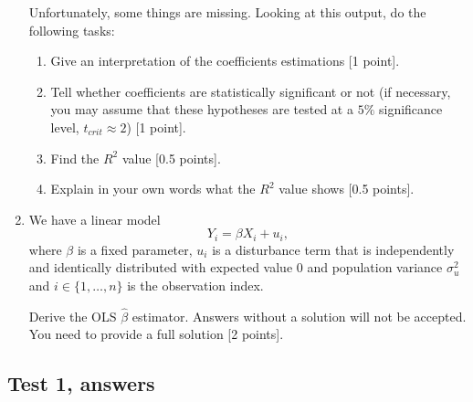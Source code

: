 \begin{enumerate}
Unfortunately, some things are missing. Looking at this output, do the following tasks:

\begin{enumerate}
    \item 
    Give an interpretation of the coefficients estimations [1 point].
    
    \item
    Tell whether coefficients are statistically significant or not (if necessary, you may assume that these hypotheses are tested at a $5\%$ significance level, $t_{crit} \approx 2$) [1 point].
    
    \item
    Find the $R^2$ value [0.5 points].
    
    \item
    Explain in your own words what the $R^2$ value shows [0.5 points].
    
\end{enumerate}

\item We have a linear model 
\[
    Y_i = \beta X_i + u_i,
\]
where $\beta$ is a fixed parameter, $u_i$ is a disturbance term that is independently and identically distributed with expected value 0 and population variance $\sigma_u^2$ 
and $i \in \{1, \ldots, n\}$ is the observation index.


Derive the OLS  $\hat \beta$ estimator. 
Answers without a solution will not be accepted. You need to provide a full solution [2 points].

\end{enumerate}


\subsection{Test 1, answers}

